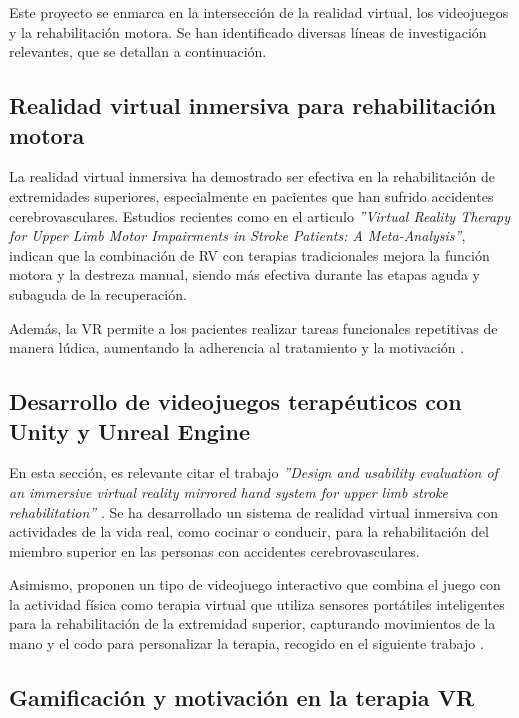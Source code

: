 
Este proyecto se enmarca en la intersección de la realidad virtual, los videojuegos y la rehabilitación motora. Se han identificado diversas líneas de investigación relevantes, que se detallan a continuación.

\subsection{Realidad virtual inmersiva para rehabilitación motora}

La realidad virtual inmersiva ha demostrado ser efectiva en la rehabilitación de extremidades superiores, especialmente en pacientes que han sufrido accidentes cerebrovasculares. Estudios recientes como en el articulo \textit{''Virtual Reality Therapy for Upper Limb Motor Impairments in Stroke Patients: A Meta-Analysis''}\cite{vr_meta_stroke2024}, indican que la combinación de RV con terapias tradicionales mejora la función motora y la destreza manual, siendo más efectiva durante las etapas aguda y subaguda de la recuperación.

Además, la VR permite a los pacientes realizar tareas funcionales repetitivas de manera lúdica, aumentando la adherencia al tratamiento y la motivación \cite{vr_upper_extremity2023}.

\subsection{Desarrollo de videojuegos terapéuticos con Unity y Unreal Engine}

En esta sección, es relevante citar el trabajo \textit{''Design and usability evaluation of an immersive virtual reality mirrored hand system for upper limb stroke rehabilitation'' }\cite{mirrored_hand_system2025}. Se ha desarrollado un sistema de realidad virtual inmersiva con actividades de la vida real, como cocinar o conducir, para la rehabilitación del miembro superior en las personas con accidentes cerebrovasculares.

Asimismo, proponen un tipo de videojuego interactivo que combina el juego con la actividad física como terapia virtual que utiliza sensores portátiles inteligentes para la rehabilitación de la extremidad superior, capturando movimientos de la mano y el codo para personalizar la terapia, recogido en el siguiente trabajo \cite{exergame_sensors2023}.

\subsection{Gamificación y motivación en la terapia VR}

